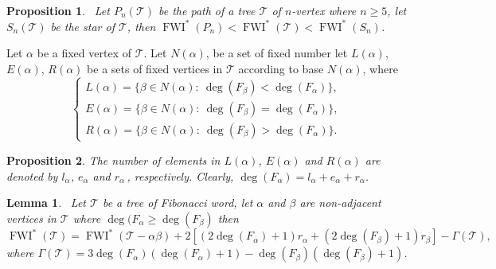 \documentclass[12pt, a4paper]{article}
\newtheorem{lemma}[theorem]{Lemma}
\newtheorem{proposition}{Proposition}[section]
\begin{document}
\begin{proposition}~\label{pron2}
Let $P_n(\mathscr{T})$ be the path of a tree $\mathscr{T}$ of $n$-vertex where $n\geq 5$, let $S_n(\mathscr{T})$ be the star of $\mathscr{T}$, then $\operatorname{FWI}^* (P_n) < \operatorname{FWI}^*(\mathscr{T}) <\operatorname{FWI}^*(S_n)$.
\end{proposition}
Let $\alpha$ be a fixed vertex of $\mathscr{T}$. Let $N(\alpha)$, be a set of fixed number let $L(\alpha)$, $E(\alpha)$, $R(\alpha)$ be a sets of fixed vertices in $\mathscr{T}$ according to base $N(\alpha)$, where
\[
\begin{cases}
  L(\alpha)=\{\beta\in N(\alpha):~\deg(F_\beta)<\deg(F_\alpha)\}, \\
  E(\alpha)=\{\beta\in N(\alpha):~\deg(F_\beta)=\deg(F_\alpha)\}, \\
  R(\alpha)=\{\beta\in N(\alpha):~\deg(F_\beta)>\deg(F_\alpha)\}.
\end{cases}
\]
\begin{proposition}
 The number of elements in $L(\alpha)$, $E(\alpha)$ and $R(\alpha)$ are denoted by $l_\alpha$, $e_\alpha$ and $r_\alpha\,$, respectively. Clearly, $\deg(F_\alpha)=l_\alpha+e_\alpha+r_\alpha$.
\end{proposition}
\begin{lemma}~\label{lemn1}
Let $\mathscr{T}$ be a tree of Fibonacci word, let $\alpha$ and $\beta$ are non-adjacent vertices in $\mathscr{T}$ where $\deg(F_\alpha\ge \deg (F_\beta)$ then
\[
\operatorname{FWI}^*(\mathscr{T})=\operatorname{FWI}^*(\mathscr{T}-\alpha\beta)+2[(2\deg(F_\alpha)+1)r_\alpha+(2\deg(F_\beta)+1)r_\beta]-\Gamma(\mathscr{T}),
\]
where $\Gamma(\mathscr{T})=3\deg(F_\alpha)(\deg (F_\alpha)+1)-  \deg(F_\beta)(\deg (F_\beta)+1)$.
\end{lemma}
\end{document}
